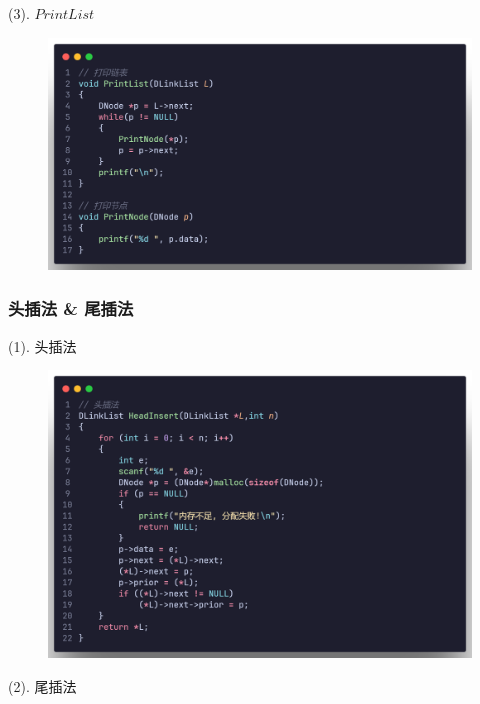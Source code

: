 (3). $PrintList$

\begin{figure}[H]
    \centering
    \includegraphics[scale=0.2]{"figure/Note/LinearList/DlPrint.png"}
\end{figure}

\subsubsection{头插法 \& 尾插法}

(1). 头插法

\begin{figure}[H]
    \centering
    \includegraphics[scale=0.2]{"figure/Note/LinearList/DlHInsert.png"}
\end{figure}

(2). 尾插法

